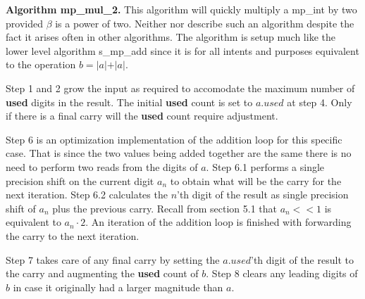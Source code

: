 \documentclass[b5paper]{book}
\begin{document}
\textbf{Algorithm mp\_mul\_2.}
This algorithm will quickly multiply a mp\_int by two provided $\beta$ is a power of two.  Neither \cite{TAOCPV2} nor \cite{HAC} describe such 
an algorithm despite the fact it arises often in other algorithms.  The algorithm is setup much like the lower level algorithm s\_mp\_add since 
it is for all intents and purposes equivalent to the operation $b = \vert a \vert + \vert a \vert$.  

Step 1 and 2 grow the input as required to accomodate the maximum number of \textbf{used} digits in the result.  The initial \textbf{used} count
is set to $a.used$ at step 4.  Only if there is a final carry will the \textbf{used} count require adjustment.

Step 6 is an optimization implementation of the addition loop for this specific case.  That is since the two values being added together 
are the same there is no need to perform two reads from the digits of $a$.  Step 6.1 performs a single precision shift on the current digit $a_n$ to
obtain what will be the carry for the next iteration.  Step 6.2 calculates the $n$'th digit of the result as single precision shift of $a_n$ plus
the previous carry.  Recall from section 5.1 that $a_n << 1$ is equivalent to $a_n \cdot 2$.  An iteration of the addition loop is finished with 
forwarding the carry to the next iteration.

Step 7 takes care of any final carry by setting the $a.used$'th digit of the result to the carry and augmenting the \textbf{used} count of $b$.  
Step 8 clears any leading digits of $b$ in case it originally had a larger magnitude than $a$.
\end{document}
